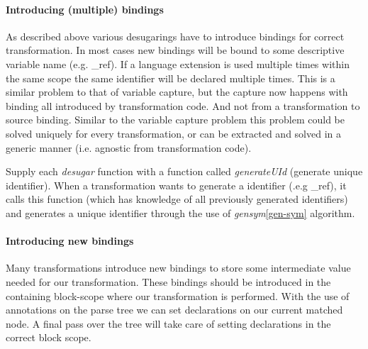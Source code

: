 \paragraph{Introducing (multiple) bindings}
As described above various desugarings have to introduce bindings for correct transformation. In most cases new bindings will be bound to some descriptive variable name (e.g. \_ref). If a language extension is used multiple times within the same scope the same identifier will be declared multiple times. This is a similar problem to that of variable capture, but the capture now happens with binding all introduced by transformation code. And not from a transformation to source binding. Similar to the variable capture problem this problem could be solved uniquely for every transformation, or can be extracted and solved in a generic manner (i.e. agnostic from transformation code). 

Supply each \textit{desugar} function with a function called \textit{generateUId} (generate unique identifier). When a transformation wants to generate a identifier (.e.g \_ref), it calls this function (which has knowledge of all previously generated identifiers) and generates a unique identifier through the use of \textit{gensym}\ref{gen-sym} algorithm.  

\paragraph{Introducing new bindings}
Many transformations introduce new bindings to store some intermediate value needed for our transformation. These bindings should be introduced in the containing block-scope where our transformation is performed. With the use of annotations on the parse tree we can set declarations on our current matched node. A final pass over the tree will take care of setting declarations in the correct block scope.
